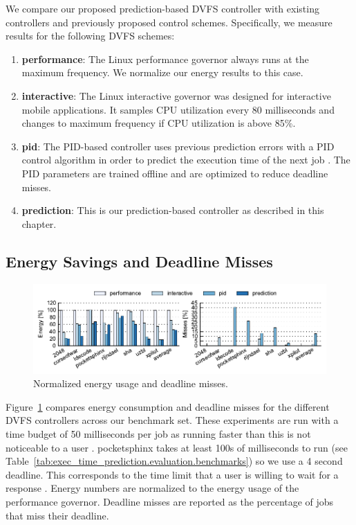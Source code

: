 We compare our proposed prediction-based DVFS controller with existing
controllers and previously proposed control schemes. Specifically, we measure
results for the following DVFS schemes:
\begin{enumerate}
  \item \textbf{performance}: The Linux performance governor
  \cite{linux_governors} always runs at the maximum frequency. We normalize our
  energy results to this case.
  \item \textbf{interactive}: The Linux interactive governor
  \cite{linux_governors} was designed for interactive mobile applications. It
  samples CPU utilization every 80 milliseconds and changes to maximum
  frequency if CPU utilization is above 85\%.
  \item \textbf{pid}: The PID-based controller uses previous prediction errors
  with a PID control algorithm in order to predict the execution time of the
  next job \cite{gu-dac08}. The PID parameters are trained offline and are
  optimized to reduce deadline misses.
  \item \textbf{prediction}: This is our prediction-based controller as
  described in this chapter.
\end{enumerate}

\subsection{Energy Savings and Deadline Misses}

\begin{figure}
  \begin{center}
    \includegraphics{exec_time_prediction/data/em_summary.pdf}
    \caption{Normalized energy usage and deadline misses.}
    \label{fig:exec_time_prediction.evaluation.em_summary}
  \end{center}
\end{figure}

Figure~\ref{fig:exec_time_prediction.evaluation.em_summary} compares energy
consumption and deadline misses for the different DVFS controllers across our
benchmark set. These experiments are run with a time budget of 50 milliseconds per job as
running faster than this is not noticeable to a user \cite{lindgaard-bit06,
eqos-hpca15}.  pocketsphinx takes at least 100s of milliseconds to run (see
Table~\ref{tab:exec_time_prediction.evaluation.benchmarks}) so we use a 4
second deadline. This corresponds to the time limit that a user is willing to
wait for a response \cite{miller-afips68}.  Energy numbers are normalized to
the energy usage of the performance governor.  Deadline misses are reported as
the percentage of jobs that miss their deadline. 

